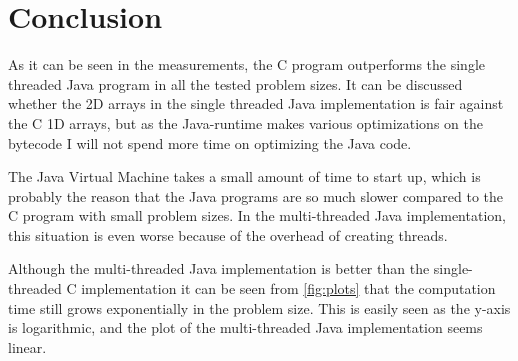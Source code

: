 \documentclass{article}
\begin{document}
	\section{Conclusion}
	As it can be seen in the measurements, the C program outperforms the single threaded Java program in all the tested problem sizes. It can be discussed whether the 2D arrays in the single threaded Java implementation is fair against the C 1D arrays, but as the Java-runtime makes various optimizations on the bytecode I will not spend more time on optimizing the Java code.
	
	The Java Virtual Machine takes a small amount of time to start up, which is probably the reason that the Java programs are so much slower compared to the C program with small problem sizes. In the multi-threaded Java implementation, this situation is even worse because of the overhead of creating threads.

	Although the multi-threaded Java implementation is better than the single-threaded C implementation it can be seen from \autoref{fig:plots} that the computation time still grows exponentially in the problem size. This is easily seen as the y-axis is logarithmic, and the plot of the multi-threaded Java implementation seems linear.
\end{document}
